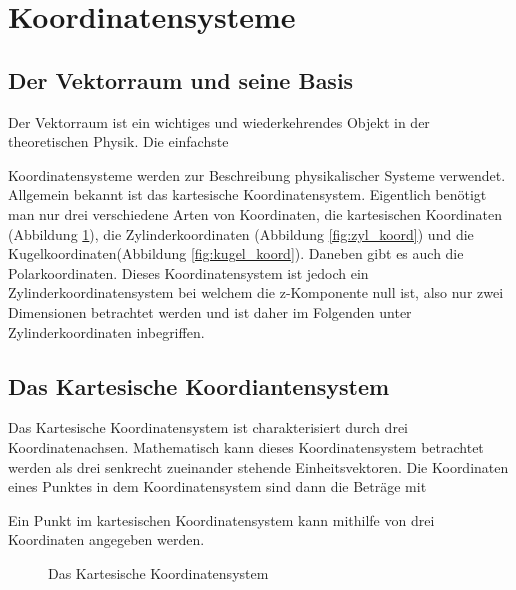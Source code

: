 \section{Koordinatensysteme}

\subsection{Der Vektorraum und seine Basis}
Der Vektorraum ist ein wichtiges und wiederkehrendes Objekt in der theoretischen Physik. 
Die einfachste 


Koordinatensysteme werden zur Beschreibung physikalischer Systeme verwendet. Allgemein bekannt ist das kartesische Koordinatensystem.
Eigentlich benötigt man nur drei verschiedene Arten von Koordinaten, die kartesischen Koordinaten (Abbildung \ref{fig:kart_koord}),  die Zylinderkoordinaten (Abbildung \ref{fig:zyl_koord}) und die Kugelkoordinaten(Abbildung \ref{fig:kugel_koord}). 
Daneben gibt es auch die Polarkoordinaten. Dieses Koordinatensystem ist jedoch ein Zylinderkoordinatensystem bei welchem die z-Komponente null ist, also nur zwei Dimensionen betrachtet werden und ist daher im Folgenden unter Zylinderkoordinaten inbegriffen. 
\subsection{Das Kartesische Koordiantensystem}
Das Kartesische Koordinatensystem ist charakterisiert durch drei Koordinatenachsen. 
Mathematisch kann dieses Koordinatensystem betrachtet werden als drei senkrecht zueinander stehende Einheitsvektoren. Die Koordinaten eines Punktes in dem Koordinatensystem sind dann die Beträge mit  


Ein Punkt im kartesischen Koordinatensystem kann mithilfe von drei Koordinaten angegeben werden. 
\begin{figure}[h]
	\centering
	\caption[Kartesische Koordinaten]{Das Kartesische Koordinatensystem}
	\label{fig:kart_koord}
\end{figure}



